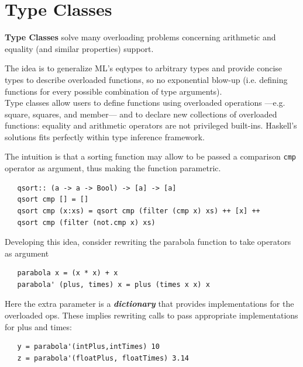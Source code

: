 \section{Type Classes}
\textbf{Type Classes} solve many overloading problems concerning arithmetic and equality (and similar properties) support.

The idea is to generalize ML’s eqtypes to arbitrary types
and provide concise types to describe overloaded
functions, so no exponential blow-up (i.e. defining functions for every possible combination of type arguments).\\
Type classes allow users to define functions using overloaded
operations {---}e.g. square, squares, and member{---} and to
declare new collections of
overloaded functions: equality and arithmetic
operators are not privileged built-ins.
Haskell's solutions fits perfectly within type inference framework.

The intuition is that a sorting function may allow to be passed a comparison \lstinline|cmp| operator as argument,
thus making the function parametric.
\begin{lstlisting}
   qsort:: (a -> a -> Bool) -> [a] -> [a]
   qsort cmp [] = []
   qsort cmp (x:xs) = qsort cmp (filter (cmp x) xs) ++ [x] ++
   qsort cmp (filter (not.cmp x) xs)
\end{lstlisting}

Developing this idea, consider rewriting the parabola function to take operators as argument
\begin{lstlisting}
   parabola x = (x * x) + x
   parabola' (plus, times) x = plus (times x x) x
\end{lstlisting}
Here the extra parameter is a \textit{\textbf{dictionary}} that provides implementations for the overloaded ops.
These implies rewriting calls to pass appropriate implementations for plus and times:
\begin{lstlisting}
   y = parabola'(intPlus,intTimes) 10
   z = parabola'(floatPlus, floatTimes) 3.14
\end{lstlisting}

